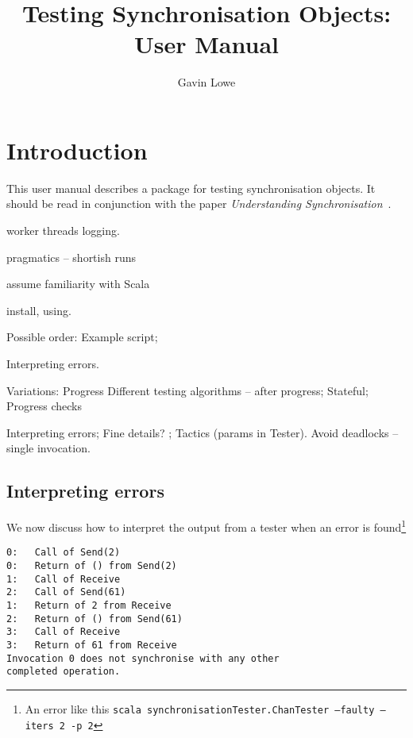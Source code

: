 \documentclass[12pt,a4paper]{article}
\title{Testing Synchronisation Objects: User Manual}
\author{Gavin Lowe}
\begin{document}
\maketitle

\section{Introduction}

This user manual describes a package for testing synchronisation objects.  It
should be read in conjunction with the paper \emph{Understanding
  Synchronisation}~\cite{sync}.  

worker threads
logging.

pragmatics -- shortish runs

assume familiarity with Scala

install, using.


Possible order:
Example script;

Interpreting errors.

Variations: 
Progress
Different testing algorithms -- after progress; 
Stateful; 
Progress checks


Interpreting errors;
Fine details? ; 
Tactics (params in Tester).  Avoid deadlocks -- single invocation. 






\subsection{Interpreting errors}

We now discuss how to interpret the output from a tester when an error is
found\footnote{An error like this \texttt{scala synchronisationTester.ChanTester --faulty --iters 2 -p 2}}

\begin{verbatim}
0:   Call of Send(2)
0:   Return of () from Send(2)
1:   Call of Receive
2:   Call of Send(61)
1:   Return of 2 from Receive
2:   Return of () from Send(61)
3:   Call of Receive
3:   Return of 61 from Receive
Invocation 0 does not synchronise with any other 
completed operation.
\end{verbatim}

\appendix



\end{document}
